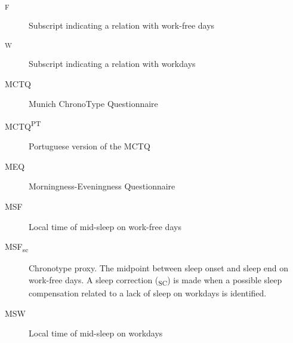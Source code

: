 \begin{siglas}

\begin{description}
\item[\textsubscript{F}]
\hspace{20cm}

Subscript indicating a relation with work-free days
\item[\textsubscript{W}]
\hspace{20cm}

Subscript indicating a relation with workdays
\item[MCTQ]
\hspace{20cm}

Munich ChronoType Questionnaire
\item[MCTQ\textsuperscript{PT}]
\hspace{20cm}

Portuguese version of the MCTQ
\item[MEQ]
\hspace{20cm}

Morningness-Eveningness Questionnaire
\item[MSF]
\hspace{20cm}

Local time of mid-sleep on work-free days
\item[MSF\textsubscript{sc}]
\hspace{20cm}

Chronotype proxy. The midpoint between sleep onset and sleep end on
work-free days. A sleep correction (\textsubscript{SC}) is made when a
possible sleep compensation related to a lack of sleep on workdays is
identified.
\item[MSW]
\hspace{20cm}

Local time of mid-sleep on workdays
\end{description}

\end{siglas}


